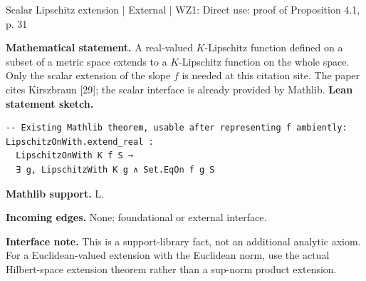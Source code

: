\documentclass[10pt,a4paper]{article}
\begin{document}
\begin{minipage}{\linewidth}
\hypertarget{node-XExt}{}
\begin{tcolorbox}[colback=white,colframe=externalfg,colbacktitle=externalbg,coltitle=ink,boxrule=0.45pt,arc=1.6mm,left=3mm,right=3mm,top=2mm,bottom=2mm,title={\sffamily\bfseries External [29] / Mathlib \hfill \texttt{XExt}}]
{\sffamily\small\color{muted}Scalar Lipschitz extension | External | WZ1: Direct use: proof of Proposition 4.1, p. 31}\par
\textbf{Mathematical statement.} A real-valued $K$-Lipschitz function defined on a subset of a metric space extends to a $K$-Lipschitz function on the whole space.
Only the scalar extension of the slope $f$ is needed at this citation site. The paper cites Kirszbraun [29]; the scalar interface is already provided by Mathlib.
\smallskip\textbf{Lean statement sketch.}
\begin{Verbatim}[fontsize=\small,breaklines=true,breakanywhere=true,tabsize=2]
-- Existing Mathlib theorem, usable after representing f ambiently:
LipschitzOnWith.extend_real :
  LipschitzOnWith K f S →
  ∃ g, LipschitzWith K g ∧ Set.EqOn f g S
\end{Verbatim}
{\footnotesize\textbf{Mathlib support.} L.\par
\textbf{Incoming edges.} None; foundational or external interface.\par}
{\footnotesize\textbf{Interface note.} This is a support-library fact, not an additional analytic axiom. For a Euclidean-valued extension with the Euclidean norm, use the actual Hilbert-space extension theorem rather than a sup-norm product extension.}
\end{tcolorbox}\end{minipage}\par\medskip
\end{document}
